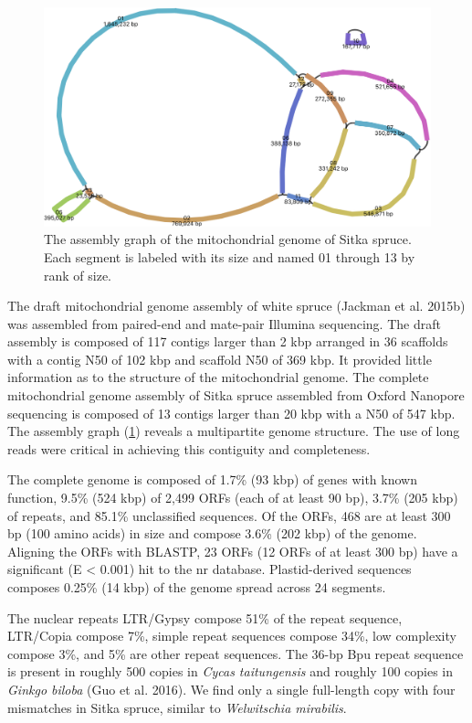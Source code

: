 \documentclass[
  12pt,
  oneside,
  openany]{book}
\begin{document}
\begin{figure}
\hypertarget{fig:genome}{%
\centering
\includegraphics{psitchensismt/genome.png}
\caption[The assembly graph of the mitochondrial genome of Sitka spruce.]{The assembly graph of the mitochondrial genome of Sitka spruce. Each segment is labeled with its size and named 01 through 13 by rank of size.}\label{fig:genome}
}
\end{figure}

The draft mitochondrial genome assembly of white spruce (Jackman et al. 2015b) was assembled from paired-end and mate-pair Illumina sequencing. The draft assembly is composed of 117 contigs larger than 2 kbp arranged in 36 scaffolds with a contig N50 of 102 kbp and scaffold N50 of 369 kbp. It provided little information as to the structure of the mitochondrial genome. The complete mitochondrial genome assembly of Sitka spruce assembled from Oxford Nanopore sequencing is composed of 13 contigs larger than 20 kbp with a N50 of 547 kbp. The assembly graph (\cref{fig:genome}) reveals a multipartite genome structure. The use of long reads were critical in achieving this contiguity and completeness.

The complete genome is composed of 1.7\% (93 kbp) of genes with known function, 9.5\% (524 kbp) of 2,499 ORFs (each of at least 90 bp), 3.7\% (205 kbp) of repeats, and 85.1\% unclassified sequences. Of the ORFs, 468 are at least 300 bp (100 amino acids) in size and compose 3.6\% (202 kbp) of the genome. Aligning the ORFs with BLASTP, 23 ORFs (12 ORFs of at least 300 bp) have a significant (E \textless{} 0.001) hit to the nr database. Plastid-derived sequences composes 0.25\% (14 kbp) of the genome spread across 24 segments.

The nuclear repeats LTR/Gypsy compose 51\% of the repeat sequence, LTR/Copia compose 7\%, simple repeat sequences compose 34\%, low complexity compose 3\%, and 5\% are other repeat sequences. The 36-bp Bpu repeat sequence is present in roughly 500 copies in \emph{Cycas taitungensis} and roughly 100 copies in \emph{Ginkgo biloba} (Guo et al. 2016). We find only a single full-length copy with four mismatches in Sitka spruce, similar to \emph{Welwitschia mirabilis}.
\end{document}
